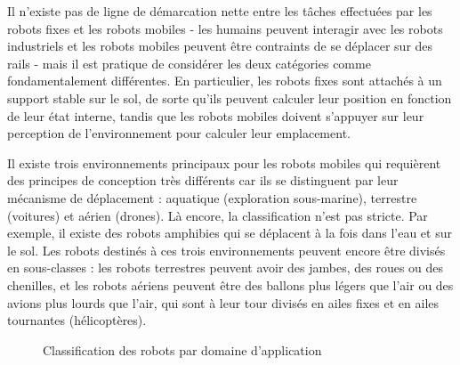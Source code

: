 Il n'existe pas de ligne de démarcation nette entre les tâches effectuées par les robots fixes et les robots mobiles - les humains peuvent interagir avec les robots industriels et les robots mobiles peuvent être contraints de se déplacer sur des rails - mais il est pratique de considérer les deux catégories comme fondamentalement différentes. En particulier, les robots fixes sont attachés à un support stable sur le sol, de sorte qu'ils peuvent calculer leur position en fonction de leur état interne, tandis que les robots mobiles doivent s'appuyer sur leur perception de l'environnement pour calculer leur emplacement.

Il existe trois environnements principaux pour les robots mobiles qui requièrent des principes de conception très différents car ils se distinguent par leur mécanisme de déplacement : aquatique (exploration sous-marine), terrestre (voitures) et aérien (drones). Là encore, la classification n'est pas stricte. Par exemple, il existe des robots amphibies qui se déplacent à la fois dans l'eau et sur le sol. Les robots destinés à ces trois environnements peuvent encore être divisés en sous-classes : les robots terrestres peuvent avoir des jambes, des roues ou des chenilles, et les robots aériens peuvent être des ballons plus légers que l'air ou des avions plus lourds que l'air, qui sont à leur tour divisés en ailes fixes et en ailes tournantes (hélicoptères).

\begin{figure}
\begin{center}
\end{center}
\caption{Classification des robots par domaine d'application}\label{fig.classification2}
\end{figure}


